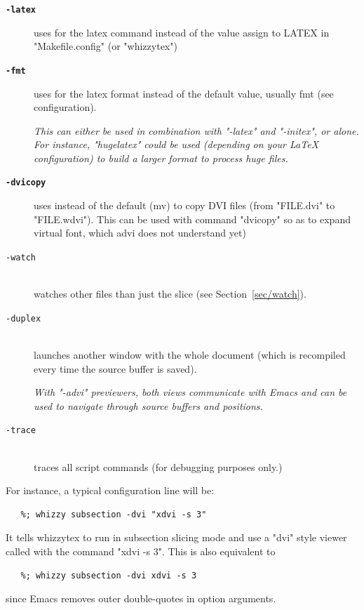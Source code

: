 \documentclass[12pt]{article}
\begin{document}
\begin{description}
\begin{description}
\item[{\bf {\tt -latex }}]\indent

uses  for the latex command instead of the value
assign to LATEX in \lst"Makefile.config" (or \lst"whizzytex")

\item[{\bf {\tt -fmt }}]\indent

uses  for the latex format instead
of the default value, usually fmt (see configuration).

{\em This can either be used in combination with \lst"-latex" and
\lst"-initex",
or alone. For instance,
\lst"hugelatex" could be used (depending on your {\LaTeX} configuration) to
build a larger format to process huge files.}
\label{configuration.tex}

\item[{\bf {\tt -dvicopy }}]\indent
\label {sec/dvicopy}

uses  instead of the default (mv) to copy DVI files
(from \lst"FILE.dvi" to \lst"FILE.wdvi"). This can be used with command
\lst"dvicopy" so as  to expand virtual font, which advi does not understand
yet)

\item[\texttt{-watch}]\indent\\
watches other files than just the slice (see Section~\ref {sec/watch}).

\item[\texttt{-duplex}]\indent\\
launches another window with the whole document (which is
recompiled every time the source buffer is saved).

{\em With \lst"-advi" previewers, both views  communicate with Emacs and can be
used to navigate through source buffers and positions.}

\item[\texttt{-trace}]\indent\\
traces all script commands (for debugging purposes only.)
\label{configuration.trace}

\end{description}

For instance, a typical configuration line will be:
\begin{verbatim}
   %; whizzy subsection -dvi "xdvi -s 3"
\end{verbatim}
It tells whizzytex to run in subsection slicing mode and use a \lst"dvi"
style viewer called with the command
\lst"xdvi -s 3". This is also equivalent to
\begin{verbatim}
   %; whizzy subsection -dvi xdvi -s 3
\end{verbatim}
since Emacs removes outer double-quotes in option arguments.


\end{description}
\end{document}
